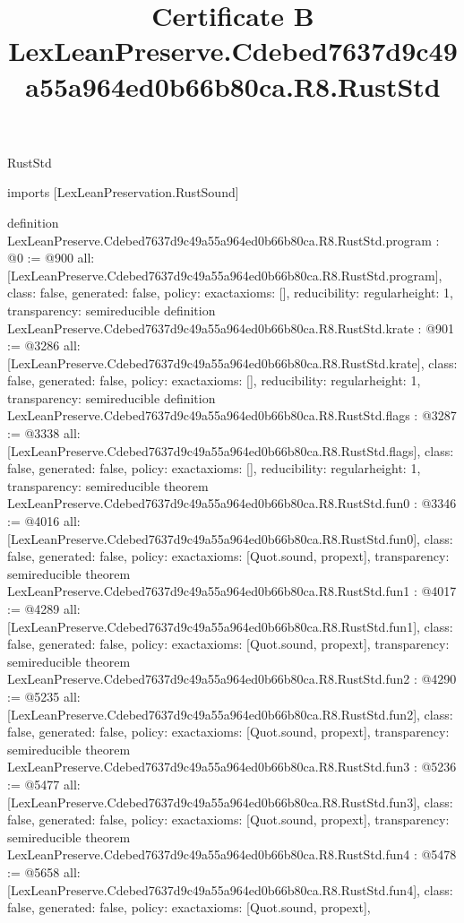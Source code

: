 \begin{lexlean}{RustStd}
\title{Certificate B LexLeanPreserve.Cdebed7637d9c49a55a964ed0b66b80ca.R8.RustStd}
\begin{coremodule}
imports [LexLeanPreservation.RustSound]

definition LexLeanPreserve.Cdebed7637d9c49a55a964ed0b66b80ca.R8.RustStd.program : @0 := @900 {
  all: [LexLeanPreserve.Cdebed7637d9c49a55a964ed0b66b80ca.R8.RustStd.program],
  class: false,
  generated: false,
  policy: exact{axioms: []},
  reducibility: regular{height: 1},
  transparency: semireducible
}
definition LexLeanPreserve.Cdebed7637d9c49a55a964ed0b66b80ca.R8.RustStd.krate : @901 := @3286 {
  all: [LexLeanPreserve.Cdebed7637d9c49a55a964ed0b66b80ca.R8.RustStd.krate],
  class: false,
  generated: false,
  policy: exact{axioms: []},
  reducibility: regular{height: 1},
  transparency: semireducible
}
definition LexLeanPreserve.Cdebed7637d9c49a55a964ed0b66b80ca.R8.RustStd.flags : @3287 := @3338 {
  all: [LexLeanPreserve.Cdebed7637d9c49a55a964ed0b66b80ca.R8.RustStd.flags],
  class: false,
  generated: false,
  policy: exact{axioms: []},
  reducibility: regular{height: 1},
  transparency: semireducible
}
theorem LexLeanPreserve.Cdebed7637d9c49a55a964ed0b66b80ca.R8.RustStd.fun0 : @3346 := @4016 {
  all: [LexLeanPreserve.Cdebed7637d9c49a55a964ed0b66b80ca.R8.RustStd.fun0],
  class: false,
  generated: false,
  policy: exact{axioms: [Quot.sound, propext]},
  transparency: semireducible
}
theorem LexLeanPreserve.Cdebed7637d9c49a55a964ed0b66b80ca.R8.RustStd.fun1 : @4017 := @4289 {
  all: [LexLeanPreserve.Cdebed7637d9c49a55a964ed0b66b80ca.R8.RustStd.fun1],
  class: false,
  generated: false,
  policy: exact{axioms: [Quot.sound, propext]},
  transparency: semireducible
}
theorem LexLeanPreserve.Cdebed7637d9c49a55a964ed0b66b80ca.R8.RustStd.fun2 : @4290 := @5235 {
  all: [LexLeanPreserve.Cdebed7637d9c49a55a964ed0b66b80ca.R8.RustStd.fun2],
  class: false,
  generated: false,
  policy: exact{axioms: [Quot.sound, propext]},
  transparency: semireducible
}
theorem LexLeanPreserve.Cdebed7637d9c49a55a964ed0b66b80ca.R8.RustStd.fun3 : @5236 := @5477 {
  all: [LexLeanPreserve.Cdebed7637d9c49a55a964ed0b66b80ca.R8.RustStd.fun3],
  class: false,
  generated: false,
  policy: exact{axioms: [Quot.sound, propext]},
  transparency: semireducible
}
theorem LexLeanPreserve.Cdebed7637d9c49a55a964ed0b66b80ca.R8.RustStd.fun4 : @5478 := @5658 {
  all: [LexLeanPreserve.Cdebed7637d9c49a55a964ed0b66b80ca.R8.RustStd.fun4],
  class: false,
  generated: false,
  policy: exact{axioms: [Quot.sound, propext]},
}
\end{coremodule}
\end{lexlean}

